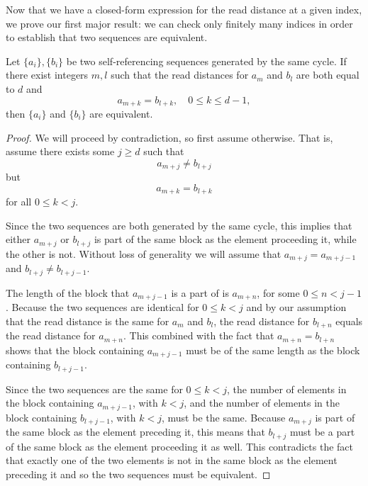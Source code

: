 \documentclass[runningheads,a4paper]{llncs}
\begin{document}
Now that we have a closed-form expression for the read distance at a given index, we prove our first major result: we can check only finitely many indices in order to establish that two sequences are equivalent.
\begin{theorem} 
\label{equivsuff}
Let $\{a_i\}, \{b_i\}$ be two self-referencing sequences generated by the same cycle. If there exist integers $m,l$ such that the read distances for $a_m$ and $b_l$ are both equal to $d$ and 
\begin{equation*}
a_{m+k} = b_{l+k}, \quad 0 \leq k \leq d-1,
\end{equation*}
then $\{a_i\}$ and $\{b_i\}$ are equivalent. 
\end{theorem}

\begin{proof}
We will proceed by contradiction, so first assume otherwise. That is, assume there exists some $j \geq d$ such that 
\begin{equation*}
a_{m+j} \neq b_{l+j}
\end{equation*}
but 
\begin{equation*}
a_{m+k} = b_{l+k}
\end{equation*} 
for all $0 \leq k < j$. 

Since the two sequences are both generated by the same cycle, this implies that either $a_{m+j}$ or $b_{l+j}$ is part of the same block as the element proceeding it, while the other is not.
Without loss of generality we will assume that $a_{m+j}=a_{m+j-1}$ and $b_{l+j} \neq b_{l+j-1}$. 

The length of the block that $a_{m+j-1}$ is a part of is $a_{m+n}$, for some $0 \leq n < j-1$. Because the two sequences are identical for $0 \leq k<j$ and by our assumption that the read distance is the same for $a_{m}$ and $b_{l}$, the read distance for $b_{l+n}$ equals the read distance for $a_{m+n}$. This combined with the fact that $a_{m+n} = b_{l+n}$ shows that the block containing $a_{m+j-1}$ must be of the same length as the block containing $b_{l+j-1}$.

Since the two sequences are the same for $0 \leq k<j$, the number of elements in the block containing $a_{m+j-1}$, with $k<j$, and the number of elements in the block containing $b_{l+j-1}$, with $k<j$, must be the same. Because $a_{m+j}$ is part of the same block as the element preceding it, this means that $b_{l+j}$ must be a part of the same block as the element proceeding it as well. 
This contradicts the fact that exactly one of the two elements is not in the same block as the element preceding it and so the two sequences must be equivalent. 


\end{proof}
\end{document}
